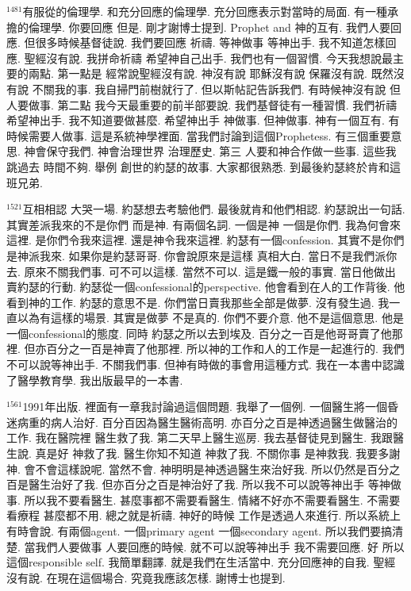 \documentclass{book}
\begin{document}
$^{1481}$有服從的倫理學.
和充分回應的倫理學.
充分回應表示對當時的局面.
有一種承擔的倫理學.
你要回應 但是.
剛才謝博士提到.
Prophet and 神的互有.
我們人要回應.
但很多時候基督徒說.
我們要回應 祈禱.
等神做事 等神出手.
我不知道怎樣回應.
聖經沒有說.
我拼命祈禱 希望神自己出手.
我們也有一個習慣.
今天我想說最主要的兩點.
第一點是 經常說聖經沒有說.
神沒有說 耶穌沒有說 保羅沒有說.
既然沒有說 不關我的事.
我自掃門前樹就行了.
但以斯帖記告訴我們.
有時候神沒有說 但人要做事.
第二點 我今天最重要的前半部要說.
我們基督徒有一種習慣.
我們祈禱 希望神出手.
我不知道要做甚麼.
希望神出手 神做事.
但神做事.
神有一個互有.
有時候需要人做事.
這是系統神學裡面.
當我們討論到這個Prophetess.
有三個重要意思.
神會保守我們.
神會治理世界 治理歷史.
第三 人要和神合作做一些事.
這些我跳過去 時間不夠.
舉例 創世的約瑟的故事.
大家都很熟悉.
到最後約瑟終於肯和這班兄弟.

$^{1521}$互相相認 大哭一場.
約瑟想去考驗他們.
最後就肯和他們相認.
約瑟說出一句話.
其實差派我來的不是你們 而是神.
有兩個名詞.
一個是神 一個是你們.
我為何會來這裡.
是你們令我來這裡.
還是神令我來這裡.
約瑟有一個confession.
其實不是你們 是神派我來.
如果你是約瑟哥哥.
你會說原來是這樣 真相大白.
當日不是我們派你去.
原來不關我們事.
可不可以這樣.
當然不可以.
這是鐵一般的事實.
當日他做出賣約瑟的行動.
約瑟從一個confessional的perspective.
他會看到在人的工作背後.
他看到神的工作.
約瑟的意思不是.
你們當日賣我那些全部是做夢.
沒有發生過.
我一直以為有這樣的場景.
其實是做夢 不是真的.
你們不要介意.
他不是這個意思.
他是一個confessional的態度.
同時 約瑟之所以去到埃及.
百分之一百是他哥哥賣了他那裡.
但亦百分之一百是神賣了他那裡.
所以神的工作和人的工作是一起進行的.
我們不可以說等神出手.
不關我們事.
但神有時做的事會用這種方式.
我在一本書中認識了醫學教育學.
我出版最早的一本書.

$^{1561}$1991年出版.
裡面有一章我討論過這個問題.
我舉了一個例.
一個醫生將一個昏迷病重的病人治好.
百分百因為醫生醫術高明.
亦百分之百是神透過醫生做醫治的工作.
我在醫院裡 醫生救了我.
第二天早上醫生巡房.
我去基督徒見到醫生.
我跟醫生說.
真是好 神救了我.
醫生你知不知道 神救了我.
不關你事 是神救我.
我要多謝神.
會不會這樣說呢.
當然不會.
神明明是神透過醫生來治好我.
所以仍然是百分之百是醫生治好了我.
但亦百分之百是神治好了我.
所以我不可以說等神出手 等神做事.
所以我不要看醫生.
甚麼事都不需要看醫生.
情緒不好亦不需要看醫生.
不需要看療程 甚麼都不用.
總之就是祈禱.
神好的時候 工作是透過人來進行.
所以系統上有時會說.
有兩個agent.
一個primary agent 一個secondary agent.
所以我們要搞清楚.
當我們人要做事 人要回應的時候.
就不可以說等神出手 我不需要回應.
好 所以這個responsible self.
我簡單翻譯.
就是我們在生活當中.
充分回應神的自我.
聖經沒有說.
在現在這個場合.
究竟我應該怎樣.
謝博士也提到.
\end{document}
